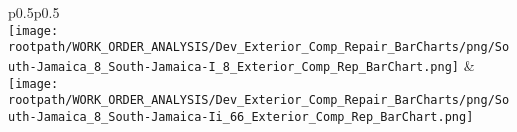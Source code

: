                         \begin{center}
                        \tablehead{\hspace{1cm}\\}
                        \tabletail{\hspace{1cm}\\}
                        \begin{supertabular}{p{0.5\textwidth}p{0.5\textwidth}}
                         \\
                        \texttt{[image: \\rootpath/WORK\_ORDER\_ANALYSIS/Dev\_Exterior\_Comp\_Repair\_BarCharts/png/South-Jamaica\_8\_South-Jamaica-I\_8\_Exterior\_Comp\_Rep\_BarChart.png]} & \texttt{[image: \\rootpath/WORK\_ORDER\_ANALYSIS/Dev\_Exterior\_Comp\_Repair\_BarCharts/png/South-Jamaica\_8\_South-Jamaica-Ii\_66\_Exterior\_Comp\_Rep\_BarChart.png]} \\
                                        \end{supertabular}
\end{center}

